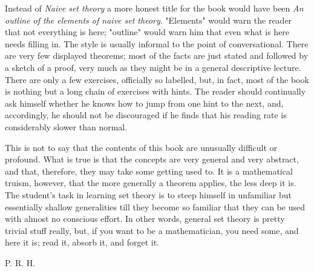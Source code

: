 Instead of \textit{Naive set theory} a more honest title for the book would have been \textit{An outline of the elements of naive set theory}. "Elements" would warn the reader that not everything is here; "outline" would warn him that even what is here needs filling in. The style is usually informal to the point of conversational. There are very few displayed theorems; most of the facts are just stated and followed by a sketch of a proof, very much as they might be in a general descriptive lecture. There are only a few exercises, officially so labelled, but, in fact, most of the book is nothing but a long chain of exercises with hints. The reader should continually ask himself whether he knows how to jump from one hint to the next, and, accordingly, he should not be discouraged if he finds that his reading rate is considerably slower than normal. 

This is not to say that the contents of this book are unusually difficult or profound. What is true is that the concepts are very general and very abstract, and that, therefore, they may take some getting used to. It is a mathematical truism, however, that the more generally a theorem applies, the less deep it is. The student's task in learning set theory is to steep himself in unfamiliar but essentially shallow generalities till they become so familiar that they can be used with almost no conscious effort. In other words, general set theory is pretty trivial stuff really, but, if you want to be a mathematician, you need some, and here it is; read it, absorb it, and forget it.

\begin{flushright}
P. R. H.
\end{flushright} 